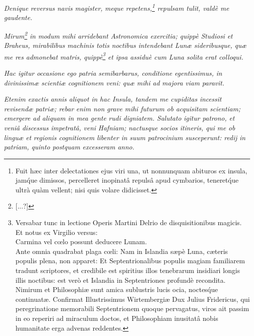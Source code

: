 \documentclass[a4paper, 11pt, oneside, polutonikogreek, german]{article}
\begin{document}
\emph{Denique reversus navis magister, meque repetens,\footnote{Fuit hæc inter delectationes ejus viri una, ut nonnunquam abituros ex insula, jam\'que dimissos, percelleret inopinatâ repulsâ apud cymbarios, teneret\'que ultrà quàm vellent; nisi quis volare didicisset.} repulsam tulit, valdè me gaudente.}

\emph{Mirum\footnote{[...?]} in modum mihi arridebant Astronomica exercitia; quippè Studiosi et Braheus, mirabilibus machinis totis noctibus intendebant Lunæ sideribusque, quæ me res admonebat matris, quippè\footnote{Versabar tunc in lectione Operis Martini Delrio de disquisitionibus magicis. Et notus ex Virgilio versus:\\\hspace*{5mm}Carmina vel cœlo possunt deducere Lunam.\\\hspace*{5mm}Ante omnia quadrabat plaga cœli: Nam in Islandia sæpè Luna, cæteris populis plena, non apparet: Et Septentrionalibus populis magiam familiarem tradunt scriptores, et credibile est spiritius illos tenebrarum insidiari longis illis noctibus: est verò et Islandia in Septentriones profundè recondita. Nimirum et Philosophiæ sunt amica sublustris lucis ocia, noctes\'que continuatæ. Confirmat Illustrissimus Wirtembergiæ Dux Julius Fridericus, qui peregrinatione memorabili Septentrionem quoque pervagatus, viros ait passim in eo reperiri ad miraculum doctos, et Philosophiam inusitatâ nobis humanitate erga advenas reddentes.} et ipsa assiduè cum Luna solita erat colloqui.}

\emph{Hac igitur occasione ego patria semibarbarus, conditione egentissimus, in divinissimæ scientiæ cognitionem veni: quæ mihi ad majora viam paravit.}

\emph{Etenim exactis annis aliquot in hac Insula, tandem me cupiditas incessit revisendæ patriæ; rebar enim non grave mihi futurum ob acquisitam scientiam; emergere ad aliquam in mea gente rudi digniatem. Salutato igitur patrono, et veniâ discessus impetratâ, veni Hafniam; nactusque socios itineris, qui me ob linguæ et regionis cognitionem libenter in suum patrocinium susceperunt: redij in patriam, quinto postquam excesseram anno.}
\end{document}
